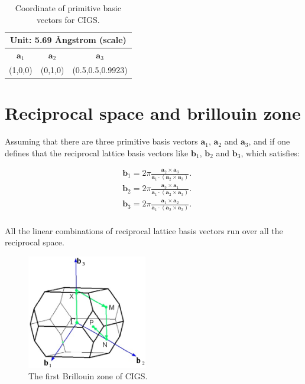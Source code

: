 \documentclass[a4paper, 12pt, titlepage,oneside,drop]{kthesis}
\begin{document}
\begin{table}
\begin{center}
\begin{tabular}{|c|c|c|}
  \hline
  \multicolumn{3}{|c|}{Unit: 5.69 {\AA}ngstrom (scale)} \\
  \hline
  $\textbf{a}_1$ & $\textbf{a}_2$ & $\textbf{a}_3$ \\ \hline
   (1,0,0) & (0,1,0) & (0.5,0.5,0.9923)   \\ 
  \hline
\end{tabular}
\caption{Coordinate of primitive basic vectors for CIGS.}
\end{center}
\end{table}

\section{Reciprocal space and brillouin zone}
\noindent Assuming that there are three primitive basis vectors  $\textbf{a}_{1}$, $\textbf{a}_{2}$ and  $\textbf{a}_{3}$, and if one defines that the reciprocal lattice basis vectors
like  $\textbf{b}_{1}$, $\textbf{b}_{2}$ and  $\textbf{b}_{3}$, which satisfies:

\begin{equation}\begin{split}
& \textbf{b}_1 = 2 \pi \frac{\textbf{a}_2 \times \textbf{a}_3}{\textbf{a}_1 \cdotp (\textbf{a}_2 \times \textbf{a}_3)}. \\
& \textbf{b}_2 = 2 \pi \frac{\textbf{a}_3 \times \textbf{a}_1}{\textbf{a}_1 \cdotp (\textbf{a}_2 \times \textbf{a}_3)}. \\
& \textbf{b}_3 = 2 \pi \frac{\textbf{a}_1 \times \textbf{a}_2}{\textbf{a}_1 \cdotp (\textbf{a}_2 \times \textbf{a}_3)}. \\
\end{split}\end{equation}

\noindent All the linear combinations of reciprocal lattice basis vectors run over all the reciprocal space.

\begin{figure}[h]
\begin{center}
\includegraphics[height=50mm]{bz.eps}
\caption{The first Brillouin zone of CIGS.}
\label{bz}
\end{center}
\end{figure}
\end{document}
